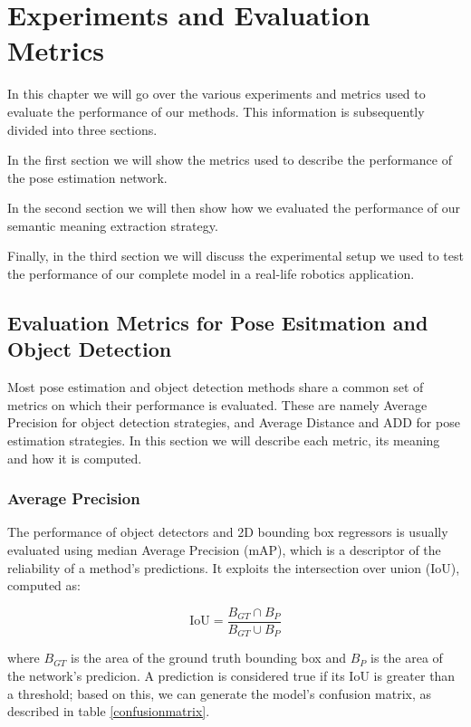 \chapter{Experiments and Evaluation Metrics}

In this chapter we will go over the various experiments and metrics used to evaluate the performance of our methods. This information is subsequently divided into three sections.

In the first section we will show the metrics used to describe the performance of the pose estimation network.

In the second section we will then show how we evaluated the performance of our semantic meaning extraction strategy.

Finally, in the third section we will discuss the experimental setup we used to test the performance of our complete model in a real-life robotics application.

\section{Evaluation Metrics for Pose Esitmation and Object Detection}

Most pose estimation and object detection methods share a common set of metrics on which their performance is evaluated. These are namely Average Precision for object detection strategies, and Average Distance and ADD for pose estimation strategies. In this section we will describe each metric, its meaning and how it is computed.

\subsection{Average Precision}

The performance of object detectors and 2D bounding box regressors is usually evaluated using median Average Precision (mAP), which is a descriptor of the reliability of a method's predictions. It exploits the intersection over union (IoU), computed as:

\begin{equation*}
    \text{IoU} = \frac{B_{GT} \cap B_{P}}{B_{GT} \cup B_{P}}
    \label{eq:IoU}
\end{equation*}

where $B_{GT}$ is the area of the ground truth bounding box and $B_{P}$ is the area of the network's predicion. A prediction is considered true if its IoU is greater than a threshold; based on this, we can generate the model's confusion matrix, as described in table \ref{confusionmatrix}.

